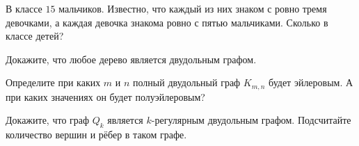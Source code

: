 \newpage
{}
	
\begin{exersize}
	В классе $15$ мальчиков. Известно, что каждый из них знаком с ровно тремя девочками, а каждая девочка знакома ровно с пятью мальчиками. Сколько в классе детей?
\end{exersize}

\begin{exersize}
	Докажите, что любое дерево является двудольным графом.
\end{exersize}

\begin{exersize}
	Определите при каких $m$ и $n$ полный двудольный граф $K_{m, n}$ будет эйлеровым. А при каких значениях он будет полуэйлеровым?
\end{exersize}

\begin{exersize}
	Докажите, что граф $Q_k$ является $k$-регулярным двудольным графом. Подсчитайте количество вершин и рёбер в таком графе.
\end{exersize}